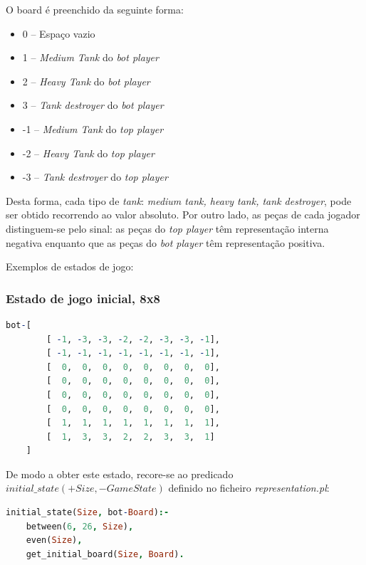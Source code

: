 \documentclass[a4paper,11pt,portuguese]{article}
\begin{document}
    \noindent O board é preenchido da seguinte forma:
    \begin{itemize}[topsep=4pt,itemsep=2pt]
        \item  0 -- Espaço vazio
        \item  1 -- \textit{Medium Tank} do \textit{bot player}
        \item  2 -- \textit{Heavy Tank} do \textit{bot player}
        \item  3 -- \textit{Tank destroyer} do \textit{bot player}
        \item -1 -- \textit{Medium Tank} do \textit{top player}
        \item -2 -- \textit{Heavy Tank} do \textit{top player}
        \item -3 -- \textit{Tank destroyer} do \textit{top player}
    \end{itemize}  

    \vspace{1em}
    Desta forma, cada tipo de \textit{tank}: \textit{medium tank, heavy tank, tank destroyer}, pode ser obtido
    recorrendo ao valor absoluto. Por outro lado, as peças de cada jogador distinguem-se pelo sinal: as peças do \textit{top player}
    têm representação interna negativa enquanto que as peças do \textit{bot player} têm representação positiva.

    \vspace{2em}
    \noindent Exemplos de estados de jogo:
    
    \subsubsection{Estado de jogo inicial, 8x8}
\begin{lstlisting}[language=prolog]
bot-[
        [ -1, -3, -3, -2, -2, -3, -3, -1],
        [ -1, -1, -1, -1, -1, -1, -1, -1],
        [  0,  0,  0,  0,  0,  0,  0,  0],
        [  0,  0,  0,  0,  0,  0,  0,  0],
        [  0,  0,  0,  0,  0,  0,  0,  0],
        [  0,  0,  0,  0,  0,  0,  0,  0],
        [  1,  1,  1,  1,  1,  1,  1,  1],
        [  1,  3,  3,  2,  2,  3,  3,  1]
    ]
\end{lstlisting}

    \noindent De modo a obter este estado, recore-se ao predicado
    $ initial\_state(+Size, -GameState) $ definido no ficheiro \textit{representation.pl}:
\begin{lstlisting}[language=prolog]
initial_state(Size, bot-Board):-
    between(6, 26, Size),
    even(Size),
    get_initial_board(Size, Board).
\end{lstlisting}
\end{document}
